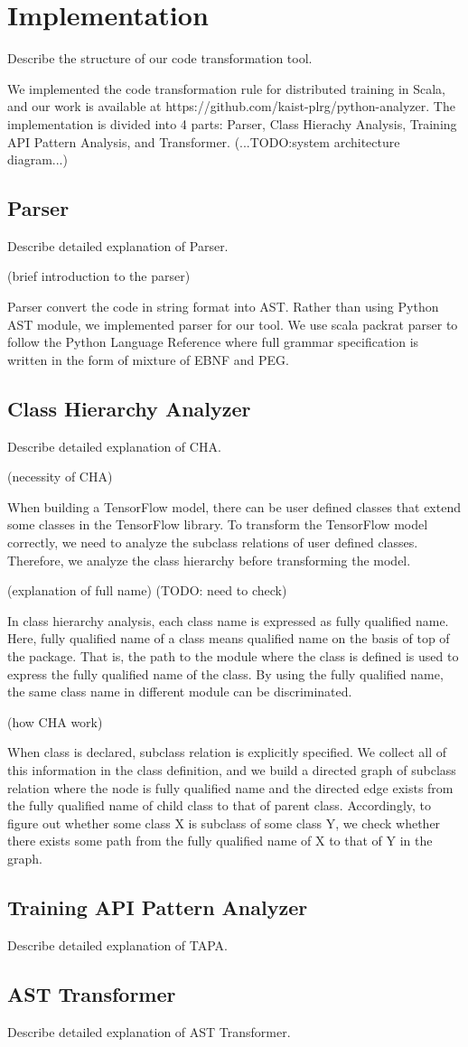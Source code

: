 \section{Implementation}\label{sec:impl}
Describe the structure of our code transformation tool.

We implemented the code transformation rule for distributed training in Scala,
and our work is available at https://github.com/kaist-plrg/python-analyzer.
The implementation is divided into 4 parts:
Parser, Class Hierachy Analysis,
Training API Pattern Analysis, and Transformer.
(...TODO:system architecture diagram...)

\subsection{Parser}
Describe detailed explanation of Parser.

(brief introduction to the parser)

Parser convert the code in string format into AST.
Rather than using Python AST module, we implemented parser for our tool.
We use scala packrat parser to follow the Python Language Reference
where full grammar specification is written in the form of mixture of EBNF and PEG.

\subsection{Class Hierarchy Analyzer}
Describe detailed explanation of CHA.

(necessity of CHA)

When building a TensorFlow model, there can be user defined classes
that extend some classes in the TensorFlow library.
To transform the TensorFlow model correctly,
we need to analyze the subclass relations of user defined classes.
Therefore, we analyze the class hierarchy before transforming the model.

(explanation of full name)
(TODO: need to check)

In class hierarchy analysis, each class name is expressed as fully qualified name.
Here, fully qualified name of a class means qualified name\cite{???}
on the basis of top of the package.
That is, the path to the module where the class is defined
is used to express the fully qualified name of the class.
By using the fully qualified name, the same class name in different module
can be discriminated.

(how CHA work)

When class is declared, subclass relation is explicitly specified.
We collect all of this information in the class definition,
and we build a directed graph of subclass relation
where the node is fully qualified name and the directed edge exists
from the fully qualified name of child class to that of parent class.
Accordingly, to figure out whether some class X is subclass of some class Y,
we check whether there exists some path from the fully qualified name of X
to that of Y in the graph.

\subsection{Training API Pattern Analyzer}
Describe detailed explanation of TAPA.

\subsection{AST Transformer}
Describe detailed explanation of AST Transformer.
